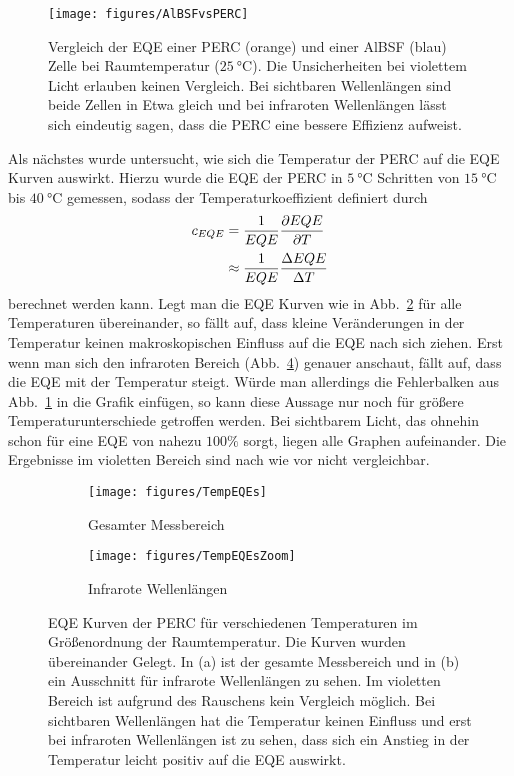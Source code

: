 \documentclass[ngerman, twocolumn]{scrartcl}
\begin{document}
\begin{figure}
\texttt{[image: figures/AlBSFvsPERC]}
\caption{Vergleich der EQE einer PERC (orange) und einer AlBSF (blau) Zelle bei Raumtemperatur ($\SI{25}{\celsius}$). Die Unsicherheiten bei violettem Licht erlauben keinen Vergleich. Bei sichtbaren Wellenlängen sind beide Zellen in Etwa gleich und bei infraroten Wellenlängen lässt sich eindeutig sagen, dass die PERC eine bessere Effizienz aufweist.}
\label{fig:AlBSFvsPERC}
\end{figure}

Als nächstes wurde untersucht, wie sich die Temperatur der PERC auf die EQE Kurven auswirkt. Hierzu wurde die EQE der PERC in $\SI{5}{\celsius}$ Schritten von $\SI{15}{\celsius}$ bis $\SI{40}{\celsius}$ gemessen, sodass der Temperaturkoeffizient definiert durch
\begin{align}
c_{EQE} &= \frac{1}{EQE}\pdv{EQE}{T} \\
&\approx \frac{1}{EQE}\frac{\Delta EQE}{\Delta T}
\end{align}
berechnet werden kann. Legt man die EQE Kurven wie in Abb.~\ref{fig:TempEQEs} für alle Temperaturen übereinander, so fällt auf, dass kleine Veränderungen in der Temperatur keinen makroskopischen Einfluss auf die EQE nach sich ziehen. Erst wenn man sich den infraroten Bereich (Abb.~\ref{fig:TempEQEsZoom}) genauer anschaut, fällt auf, dass die EQE mit der Temperatur steigt. Würde man allerdings die Fehlerbalken aus Abb.~\ref{fig:AlBSFvsPERC} in die Grafik einfügen, so kann diese Aussage nur noch für größere Temperaturunterschiede getroffen werden. Bei sichtbarem Licht, das ohnehin schon für eine EQE von nahezu $100\%$ sorgt, liegen alle Graphen aufeinander. Die Ergebnisse im violetten Bereich sind nach wie vor nicht vergleichbar.

\begin{figure}
\begin{subfigure}{\columnwidth}
\texttt{[image: figures/TempEQEs]}
\caption{Gesamter Messbereich}
\label{fig:TempEQEs}
\end{subfigure}

\begin{subfigure}{\columnwidth}
\texttt{[image: figures/TempEQEsZoom]}
\caption{Infrarote Wellenlängen}
\label{fig:TempEQEsZoom}
\end{subfigure}
\caption{EQE Kurven der PERC für verschiedenen Temperaturen im Größenordnung der Raumtemperatur. Die Kurven wurden übereinander Gelegt. In (a) ist der gesamte Messbereich und in (b) ein Ausschnitt für infrarote Wellenlängen zu sehen. Im violetten Bereich ist aufgrund des Rauschens kein Vergleich möglich. Bei sichtbaren Wellenlängen hat die Temperatur keinen Einfluss und erst bei infraroten Wellenlängen ist zu sehen, dass sich ein Anstieg in der Temperatur leicht positiv auf die EQE auswirkt.}
\end{figure}
\end{document}
